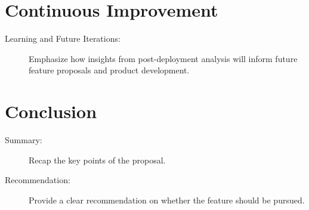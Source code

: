 \documentclass{article}
\begin{document}
\section{Continuous Improvement}
\begin{description}
    \item[Learning and Future Iterations:] Emphasize how insights from post-deployment analysis will inform future feature proposals and product development.
\end{description}

\section{Conclusion}
\begin{description}
    \item[Summary:] Recap the key points of the proposal.
    \item[Recommendation:] Provide a clear recommendation on whether the feature should be pursued.
\end{description}

\vspace*{\fill}
\hrulefill
\vspace*{\fill}

\newpage 

\tableofcontents
{}

\listoftables
\listoffigures
\end{document}
